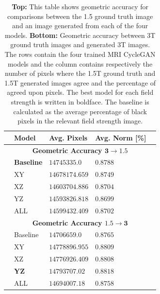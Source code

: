 \documentclass[11pt, fleqn, titlepage]{article}
\newcommand{\1}[1]{\mathds{1}\left[#1\right]}
\begin{document}
\begin{table}[H]
	\begin{center}
		\begin{tabular}{l l l l l}
			\toprule
			& \textbf{Model}   & \textbf{Avg. Pixels} & \textbf{Avg. Norm [\%]}  & \\ \midrule
			&\multicolumn{3}{c}{\textbf{Geometric Accuracy $\mathbf{3\rightarrow1.5}$}}   & \\
			&\textbf{Baseline}          & $\mathbf{14745335.0}$         & $\mathbf{0.8788}$                 & \\
			&XY                & $14678174.659$       & $0.8749$                 & \\
			&XZ                & $14603704.886$       & $0.8704$                 & \\
			&YZ                & $14593826.818$       & $0.8699$                 & \\
			&ALL               & $14599432.409$       & $0.8702$                 & \\
			&\multicolumn{3}{c}{\textbf{Geometric Accuracy $\mathbf{1.5\rightarrow3}$}}   & \\
			&Baseline          & $14706659.0$         & $0.8765$                 & \\
			&XY                & $14778896.955$	      & $0.8809$                 & \\
			&XZ                & $14776926.409$       & $0.8808$                 & \\
			&\textbf{YZ}                & $\mathbf{14793707.02}$        & $\mathbf{0.8818}$                 & \\
			&ALL               & $14694007.18$        & $0.8758$                 & \\ \bottomrule
		\end{tabular}
		\caption{\textbf{Top:} This table shows geometric accuracy for comparisons between the 1.5 ground truth image and an image generated from each of the four models. \textbf{Bottom:} Geometric accuracy between 3T ground truth images and generated 3T images. The rows contain the four trained MRI CycleGAN models and the column contains respectively the number of pixels where the 1.5T ground truth and 1.5T generated images agree and the percentage of agreed upon pixels. The best model for each field strength is written in boldface. The baseline is calculated as the average percentage of black pixels in the relevant field strength image.}
		\label{tab:metrics_geometric_accuracy}
	\end{center}
\end{table}
\end{document}
